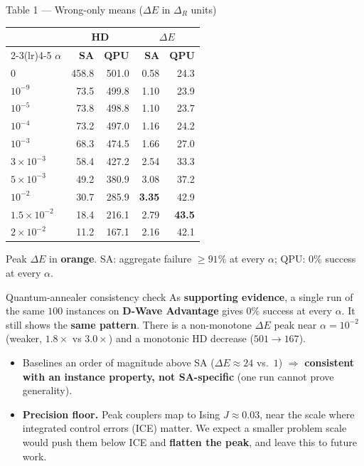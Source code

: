 \documentclass[final]{beamer}
\newcommand{\hl}[1]{{\color{accent}\textbf{#1}}}      %
\newcommand{\sacol}[1]{{\color{saBlue}\textbf{#1}}}
\newcommand{\qpucol}[1]{{\color{qpuRed}\textbf{#1}}}
\newcommand{\lab}[1]{{\color{deepblue}\textbf{#1}}}    %
\newcommand{\bnum}[1]{\smash{\raisebox{-0.27cm}{\tikz\node[circle,fill=white,text=deepblue,inner sep=1pt,minimum size=0.82cm,font=\normalsize\bfseries]{#1};}}\hspace{0.2cm}}
\begin{document}
\begin{frame}[t]
\begin{columns}[t]
\begin{column}{\onecolwid}
\begin{block}{\bnum{8}Table 1 --- Wrong-only means ($\Delta E$ in $\Delta_R$ units)}
\centering\renewcommand{\arraystretch}{1.18}\setlength{\tabcolsep}{8pt}
{\normalsize
\begin{tabular}{l rr rr}
\toprule
 & \multicolumn{2}{c}{\textbf{HD}} & \multicolumn{2}{c}{\boldmath$\Delta E$} \\
\cmidrule(lr){2-3}\cmidrule(lr){4-5}
$\alpha$ & \sacol{SA} & \qpucol{QPU} & \sacol{SA} & \qpucol{QPU} \\
\midrule
$0$            & 458.8 & 501.0 & 0.58 & 24.3 \\
\rowcolor{bandgray}$10^{-9}$      &  73.5 & 499.8 & 1.10 & 23.9 \\
$10^{-5}$      &  73.8 & 498.8 & 1.10 & 23.7 \\
\rowcolor{bandgray}$10^{-4}$      &  73.2 & 497.0 & 1.16 & 24.2 \\
$10^{-3}$      &  68.3 & 474.5 & 1.66 & 27.0 \\
\rowcolor{bandgray}$3\times10^{-3}$ & 58.4 & 427.2 & 2.54 & 33.3 \\
$5\times10^{-3}$ & 49.2 & 380.9 & 3.08 & 37.2 \\
\rowcolor{bandgray}$10^{-2}$      &  30.7 & 285.9 & \hl{3.35} & 42.9 \\
$1.5\times10^{-2}$ & 18.4 & 216.1 & 2.79 & \hl{43.5} \\
\rowcolor{bandgray}$2\times10^{-2}$ & 11.2 & 167.1 & 2.16 & 42.1 \\
\bottomrule
\end{tabular}\par}
\RaggedRight\vskip0.5cm
{\normalsize Peak $\Delta E$ in \hl{orange}. SA: aggregate failure $\ge 91\%$ at every $\alpha$; QPU: $0\%$ success at every $\alpha$.}
\end{block}

\begin{block}{\bnum{9}Quantum-annealer consistency check}
\RaggedRight
As \textbf{supporting evidence}, a single run of the same $100$ instances on \textbf{D-Wave Advantage} gives $0\%$ success at every $\alpha$. It still shows the \textbf{same pattern}. There is a non-monotone $\Delta E$ peak near $\alpha{=}10^{-2}$ (weaker, $1.8\times$ vs $3.0\times$) and a monotonic HD decrease (\qpucol{$501\to167$}).
\begin{itemize}
  \item Baselines an order of magnitude above SA ($\Delta E\approx 24$ vs.\ $1$) $\Rightarrow$ \textbf{consistent with an instance property, not SA-specific} (one run cannot prove generality).
  \item \lab{Precision floor.} Peak couplers map to Ising $J\approx 0.03$, near the scale where integrated control errors (ICE) matter. We expect a smaller problem scale would push them below ICE and \textbf{flatten the peak}, and leave this to future work.
\end{itemize}
\end{block}


\end{column}
\end{columns}
\end{frame}
\end{document}
